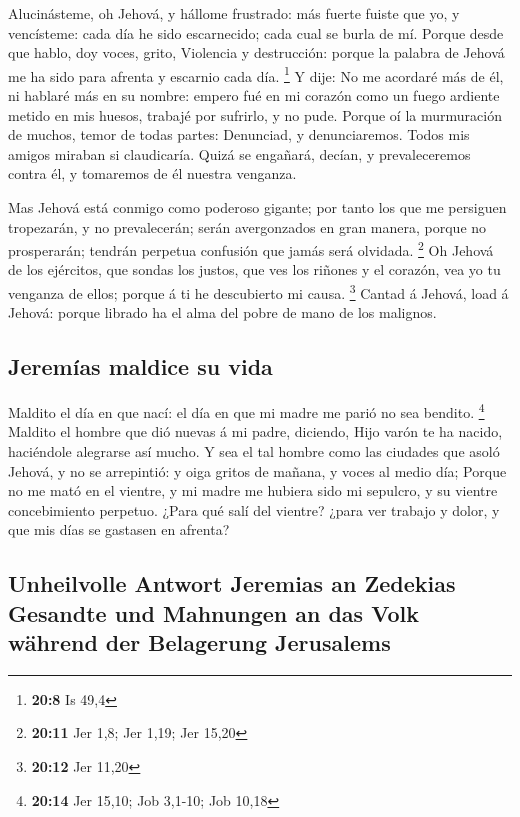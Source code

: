  Alucinásteme, oh Jehová, y hállome frustrado: más fuerte
fuiste que yo, y vencísteme: cada día he sido escarnecido; cada cual se
burla de mí.  Porque desde que hablo, doy voces, grito,
Violencia y destrucción: porque la palabra de Jehová me ha sido para
afrenta y escarnio cada día. \footnote{\textbf{20:8} Is 49,4}
 Y dije: No me acordaré más de él, ni hablaré más en su
nombre: empero fué en mi corazón como un fuego ardiente metido en mis
huesos, trabajé por sufrirlo, y no pude.  Porque oí la
murmuración de muchos, temor de todas partes: Denunciad, y
denunciaremos. Todos mis amigos miraban si claudicaría. Quizá se
engañará, decían, y prevaleceremos contra él, y tomaremos de él nuestra
venganza.

 Mas Jehová está conmigo como poderoso gigante; por tanto
los que me persiguen tropezarán, y no prevalecerán; serán avergonzados
en gran manera, porque no prosperarán; tendrán perpetua confusión que
jamás será olvidada. \footnote{\textbf{20:11} Jer 1,8; Jer 1,19; Jer
  15,20}  Oh Jehová de los ejércitos, que sondas los
justos, que ves los riñones y el corazón, vea yo tu venganza de ellos;
porque á ti he descubierto mi causa. \footnote{\textbf{20:12} Jer 11,20}
 Cantad á Jehová, load á Jehová: porque librado ha el alma
del pobre de mano de los malignos.

\hypertarget{jeremuxedas-maldice-su-vida}{%
\subsection{Jeremías maldice su
vida}\label{jeremuxedas-maldice-su-vida}}

 Maldito el día en que nací: el día en que mi madre me
parió no sea bendito. \footnote{\textbf{20:14} Jer 15,10; Job 3,1-10;
  Job 10,18}  Maldito el hombre que dió nuevas á mi padre,
diciendo, Hijo varón te ha nacido, haciéndole alegrarse así mucho.
 Y sea el tal hombre como las ciudades que asoló Jehová, y
no se arrepintió: y oiga gritos de mañana, y voces al medio día;
 Porque no me mató en el vientre, y mi madre me hubiera
sido mi sepulcro, y su vientre concebimiento perpetuo. 
¿Para qué salí del vientre? ¿para ver trabajo y dolor, y que mis días se
gastasen en afrenta?

\hypertarget{unheilvolle-antwort-jeremias-an-zedekias-gesandte-und-mahnungen-an-das-volk-wuxe4hrend-der-belagerung-jerusalems}{%
\subsection{Unheilvolle Antwort Jeremias an Zedekias Gesandte und
Mahnungen an das Volk während der Belagerung
Jerusalems}\label{unheilvolle-antwort-jeremias-an-zedekias-gesandte-und-mahnungen-an-das-volk-wuxe4hrend-der-belagerung-jerusalems}}

